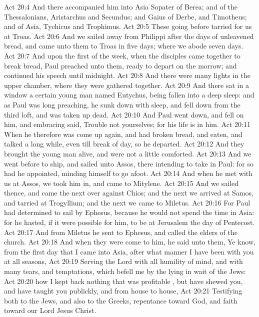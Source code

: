 \vs Act 20:4 And there accompanied him into Asia Sopater of Berea; and of the Thessalonians, Aristarchus and Secundus; and Gaius of Derbe, and Timotheus; and of Asia, Tychicus and Trophimus.
\vs Act 20:5 These going before tarried for us at Troas.
\vs Act 20:6 And we sailed away from Philippi after the days of unleavened bread, and came unto them to Troas in five days; where we abode seven days.
\vs Act 20:7 And upon the first  of the week, when the disciples came together to break bread, Paul preached unto them, ready to depart on the morrow; and continued his speech until midnight.
\vs Act 20:8 And there were many lights in the upper chamber, where they were gathered together.
\vs Act 20:9 And there sat in a window a certain young man named Eutychus, being fallen into a deep sleep: and as Paul was long preaching, he sunk down with sleep, and fell down from the third loft, and was taken up dead.
\vs Act 20:10 And Paul went down, and fell on him, and embracing  said, Trouble not yourselves; for his life is in him.
\vs Act 20:11 When he therefore was come up again, and had broken bread, and eaten, and talked a long while, even till break of day, so he departed.
\vs Act 20:12 And they brought the young man alive, and were not a little comforted.
\vs Act 20:13 And we went before to ship, and sailed unto Assos, there intending to take in Paul: for so had he appointed, minding himself to go afoot.
\vs Act 20:14 And when he met with us at Assos, we took him in, and came to Mitylene.
\vs Act 20:15 And we sailed thence, and came the next  over against Chios; and the next  we arrived at Samos, and tarried at Trogyllium; and the next  we came to Miletus.
\vs Act 20:16 For Paul had determined to sail by Ephesus, because he would not spend the time in Asia: for he hasted, if it were possible for him, to be at Jerusalem the day of Pentecost.
\vs Act 20:17 And from Miletus he sent to Ephesus, and called the elders of the church.
\vs Act 20:18 And when they were come to him, he said unto them, Ye know, from the first day that I came into Asia, after what manner I have been with you at all seasons,
\vs Act 20:19 Serving the Lord with all humility of mind, and with many tears, and temptations, which befell me by the lying in wait of the Jews:
\vs Act 20:20  how I kept back nothing that was profitable , but have shewed you, and have taught you publickly, and from house to house,
\vs Act 20:21 Testifying both to the Jews, and also to the Greeks, repentance toward God, and faith toward our Lord Jesus Christ.
